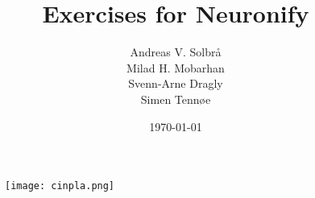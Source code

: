 \documentclass[12pt]{article}
\title{Exercises for Neuronify}
\author{Andreas V. Solbr\aa \\
Milad H. Mobarhan \\
Svenn-Arne Dragly \\
Simen Tenn\o e}
\date{\today}
\begin{document}

\begin{figure}
\centering
\texttt{[image: cinpla.png]}
\end{figure}
\maketitle







\end{document}
